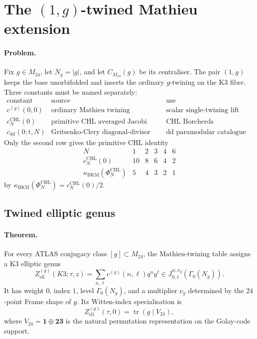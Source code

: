 \providecommand{\kBKM}{\kappa_{\mathrm{BKM}}}
\providecommand{\kch}{\kappa_{\mathrm{ch}}}
\providecommand{\kchHeis}{\kappa_{\mathrm{ch}}^{\mathrm{Heis}}}
\providecommand{\kcat}{\kappa_{\mathrm{cat}}}
\providecommand{\kfiber}{\kappa_{\mathrm{fiber}}}
\providecommand{\Zgell}{Z^{(g)}_{\mathrm{ell}}}
\providecommand{\CM}{C_{M_{24}}}
\providecommand{\Phig}{\Phi_g}
\providecommand{\PhiCHL}[1]{\Phi_{#1}^{\mathrm{CHL}}}
\providecommand{\cCHL}{c^{\mathrm{CHL}}}
\providecommand{\cdd}{c_{\mathrm{dd}}}
\providecommand{\phiEZ}{\phi_{0,1}^{\mathrm{EZ}}}

\section*{The \((1,g)\)-twined Mathieu extension}
\label{sec:mathieu-one-g-twined}

\paragraph{Problem.}
Fix \(g\in M_{24}\), let \(N_g=|g|\), and let \(\CM(g)\) be its
centraliser.  The pair \((1,g)\) keeps the base unorbifolded and
inserts the ordinary \(g\)-twining on the K3 fibre.  Three constants
must be named separately:
\[
\begin{array}{c|c|c}
\text{constant} & \text{source} & \text{use}\\ \hline
c^{(g)}(0,0) & \text{ordinary Mathieu twining} &
\text{scalar single-twining lift}\\
\cCHL_N(0) & \text{primitive CHL averaged Jacobi form} &
\text{CHL Borcherds denominator}\\
\cdd(0;t,N) & \text{Gritsenko-Clery diagonal-divisor row} &
\text{dd paramodular catalogue}
\end{array}
\]
Only the second row gives the primitive CHL identity
\[
\begin{array}{c|ccccc}
N & 1 & 2 & 3 & 4 & 6\\ \hline
\cCHL_N(0) & 10 & 8 & 6 & 4 & 2\\
\kBKM(\PhiCHL{N}) & 5 & 4 & 3 & 2 & 1
\end{array}
\]
by \(\kBKM(\PhiCHL{N})=\cCHL_N(0)/2\).

\subsection*{Twined elliptic genus}

\paragraph{Theorem.}
For every ATLAS conjugacy class \([g]\subset M_{24}\), the
Mathieu-twining table assigns a K3 elliptic genus
\[
  \Zgell(K3;\tau,z)
  =
  \sum_{n,\ell} c^{(g)}(n,\ell) q^n y^\ell
  \in J^{w,\nu_g}_{0,1}\!\left(\Gamma_0(N_g)\right).
\]
It has weight \(0\), index \(1\), level \(\Gamma_0(N_g)\), and a
multiplier \(\nu_g\) determined by the \(24\)-point Frame shape of
\(g\).  Its Witten-index specialisation is
\[
  \Zgell(\tau,0)=\operatorname{tr}(g\mid V_{24}),
\]
where \(V_{24}=\mathbf{1}\oplus \mathbf{23}\) is the natural
permutation representation on the Golay-code support.

